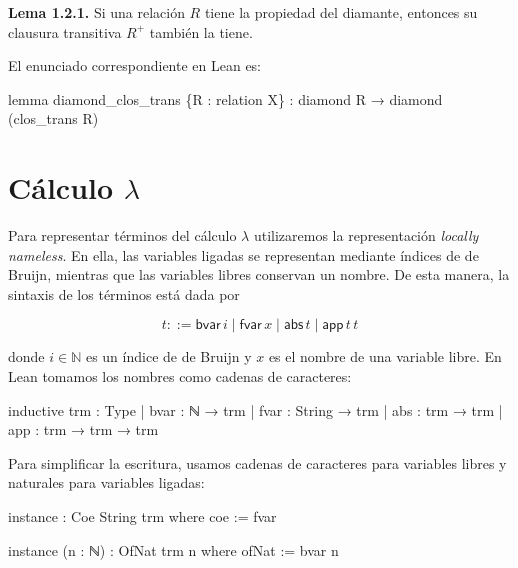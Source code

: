 \documentclass[
  spanish,
  letterpaper,
  DIV=11,
  numbers=noendperiod]{scrreprt}
\newenvironment{Shaded}{\begin{snugshade}}{\end{snugshade}}
\newcommand{\KeywordTok}[1]{\textcolor[rgb]{0.00,0.23,0.31}{\textbf{#1}}}
\newcommand{\NormalTok}[1]{\textcolor[rgb]{0.00,0.23,0.31}{#1}}
\renewcommand{\NormalTok}[1]{\textcolor[HTML]{000000}{#1}}
\renewcommand{\KeywordTok}[1]{\textcolor[HTML]{0000FF}{#1}}
\theoremstyle{remark}
\begin{document}
\textbf{Lema 1.2.1.} Si una relación \(R\) tiene la propiedad del
diamante, entonces su clausura transitiva \(R^+\) también la tiene.

El enunciado correspondiente en Lean es:

\begin{Shaded}
\begin{Highlighting}[]
\KeywordTok{lemma}\NormalTok{ diamond\_clos\_trans \{R : relation X\} :}
\NormalTok{    diamond R →}
\NormalTok{    diamond (clos\_trans R)}
\end{Highlighting}
\end{Shaded}


\chapter{\texorpdfstring{Cálculo
\(\lambda\)}{Cálculo \textbackslash lambda}}\label{cuxe1lculo-lambda}

Para representar términos del cálculo \(\lambda\) utilizaremos la
representación \emph{locally nameless}. En ella, las variables ligadas
se representan mediante índices de de Bruijn, mientras que las variables
libres conservan un nombre. De esta manera, la sintaxis de los términos
está dada por

\[
t ::= 
\mathsf{bvar} \, i  \mid 
\mathsf{fvar} \, x  \mid 
\mathsf{abs}  \, t  \mid 
\mathsf{app}  \, t \, t  
\]

donde \(i \in \mathbb{N}\) es un índice de de Bruijn y \(x\) es el
nombre de una variable libre. En Lean tomamos los nombres como cadenas
de caracteres:

\begin{Shaded}
\begin{Highlighting}[]
\NormalTok{inductive trm : }\KeywordTok{Type}
\NormalTok{  | bvar : ℕ → trm}
\NormalTok{  | fvar : String → trm}
\NormalTok{  | abs  : trm → trm}
\NormalTok{  | app  : trm → trm → trm}
\end{Highlighting}
\end{Shaded}

Para simplificar la escritura, usamos cadenas de caracteres para
variables libres y naturales para variables ligadas:

\begin{Shaded}
\begin{Highlighting}[]
\NormalTok{instance : Coe String trm where}
\NormalTok{  coe := fvar}

\NormalTok{instance (n : ℕ) : OfNat trm n where}
\NormalTok{  ofNat := bvar n}
\end{Highlighting}
\end{Shaded}
\end{document}
